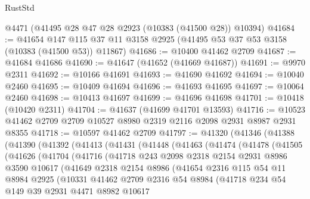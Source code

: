 \begin{lexlean}{RustStd}
\begin{coremodule}
    @4471
    (@41495 @28 @47 @28 @2923 (@10383 (@41500 @28)) @10394)
@41684 := @41654
    @147
    @115
    @37
    @11
    @3158
    @2925
    (@41495 @53 @37 @53 @3158 (@10383 (@41500 @53)) @11867)
@41686 := @10400 @41462 @2709
@41687 := @41684 @41686
@41690 := @41647 (@41652 (@41669 @41687))
@41691 := @9970 @2311
@41692 := @10166 @41691
@41693 := @41690 @41692
@41694 := @10040 @2460
@41695 := @10409 @41694
@41696 := @41693 @41695
@41697 := @10064 @2460
@41698 := @10413 @41697
@41699 := @41696 @41698
@41701 := @10418 (@10420 @2311)
@41704 := @41637 (@41699 @41701 @13593)
@41716 := @10523 @41462 @2709 @2709 @10527 @8980 @2319 @2116 @2098 @2931 @8987 @2931 @8355
@41718 := @10597 @41462 @2709
@41797 := @41320
    (@41346
      (@41388
        (@41390
          (@41392
            (@41413
              (@41431
                (@41448
                  (@41463
                    (@41474
                      (@41478
                        (@41505
                          (@41626
                            (@41704
                              (@41716
                                (@41718
                                  @243
                                  @2098
                                  @2318
                                  @2154
                                  @2931
                                  @8986
                                  @3590
                                  @10617
                                  (@41649
                                    @2318
                                    @2154
                                    @8986
                                    (@41654
                                      @2316
                                      @115
                                      @54
                                      @11
                                      @8984
                                      @2925
                                      (@10331
                                        @41462
                                        @2709
                                        @2316
                                        @54
                                        @8984
                                        (@41718
                                          @234
                                          @54
                                          @149
                                          @39
                                          @2931
                                          @4471
                                          @8982
                                          @10617

\end{coremodule}
\end{lexlean}
